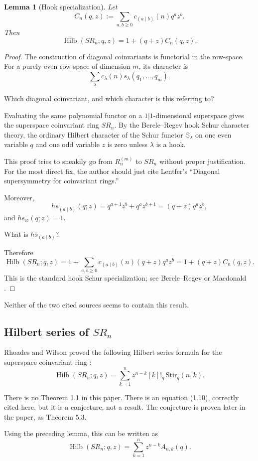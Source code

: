 \documentclass[12pt]{article}
\newtheorem{lemma}[theorem]{Lemma}
\DeclareMathOperator{\Hilb}{Hilb}
\newcommand{\review}[1]{\begin{reviewbox}#1\end{reviewbox}}
\begin{document}
\begin{lemma}[Hook specialization]
Let
\[
C_n(q,z):=\sum_{a,b\geq 0} c_{(a\mid b)}(n)q^a z^b.
\]
Then
\[
\Hilb(SR_n;q,z)=1+(q+z)C_n(q,z).
\]
\end{lemma}

\begin{proof}
The construction of diagonal coinvariants is functorial in the row-space. For a
purely even row-space of dimension \(m\), its character is
\[
\sum_\lambda c_\lambda(n)s_\lambda(q_1,\dots,q_m).
\]

\review{Which diagonal coinvariant, and which character is this referring to?}

Evaluating the same polynomial functor on a \(1|1\)-dimensional superspace gives
the superspace coinvariant ring \(SR_n\). By the Berele--Regev hook Schur
character theory, the ordinary Hilbert character of the Schur functor
\(\mathbb S_\lambda\) on one even variable \(q\) and one odd variable \(z\) is zero
unless \(\lambda\) is a hook. 

\review{This proof tries to sneakily go from $R_n^{(m)}$ to $SR_n$ without proper justification. For the most direct fix, the author should just cite Lentfer's ``Diagonal supersymmetry for coinvariant rings.''}

Moreover,
\[
hs_{(a\mid b)}(q;z)=q^{a+1}z^b+q^a z^{b+1}=(q+z)q^a z^b,
\]
and \(hs_\varnothing(q;z)=1\). 

\review{What is $hs_{(a\mid b)}$?}

Therefore
\[
\Hilb(SR_n;q,z)
=
1+\sum_{a,b\geq 0}c_{(a\mid b)}(n)(q+z)q^a z^b
=
1+(q+z)C_n(q,z).
\]
This is the standard hook Schur specialization; see Berele--Regev
\cite{BereleRegev} or Macdonald \cite[Ch.~I, \S3, Ex.~23]{Macdonald}.
\end{proof}

\review{Neither of the two cited sources seems to contain this result.}

\subsection{Hilbert series of \(SR_n\)}

Rhoades and Wilson proved the following Hilbert series formula for the superspace
coinvariant ring \cite[Theorem~1.1 and Eq.~(1.10)]{RhoadesWilson}:
\[
\Hilb(SR_n;q,z)=
\sum_{k=1}^{n} z^{n-k}[k]!_q\,\mathrm{Stir}_q(n,k).
\]

\review{There is no Theorem 1.1 in this paper. There is an equation (1.10), correctly cited here, but it is a conjecture, not a result. The conjecture is proven later in the paper, as Theorem 5.3.}
Using the preceding lemma, this can be written as
\[
\Hilb(SR_n;q,z)=
\sum_{k=1}^{n}z^{n-k}A_{n,k}(q).
\]
\end{document}
